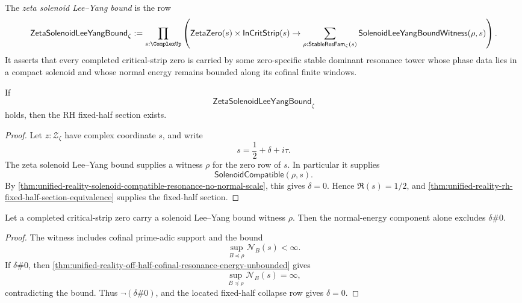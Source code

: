 \begin{definition}
\label{def:unified-reality-zeta-solenoid-lee-yang-bound}
The \emph{zeta solenoid Lee--Yang bound} is the row
$$
\mathsf{ZetaSolenoidLeeYangBound}_{\zeta}
:=
\prod_{s:\ComplexUp}
\left(
\mathsf{ZetaZero}(s)
\times
\mathsf{InCritStrip}(s)
\to
\sum_{\rho:\mathsf{StableResFam}_{\zeta}(s)}
\mathsf{SolenoidLeeYangBoundWitness}(\rho,s)
\right).
$$
It asserts that every completed critical-strip zero is carried by some
zero-specific stable dominant resonance tower whose phase data lies in a
compact solenoid and whose normal energy remains bounded along its
cofinal finite windows.
\end{definition}

\begin{theorem}
\label{thm:unified-reality-zeta-solenoid-lee-yang-bound-conditionally-sufficient}
If
$$
\mathsf{ZetaSolenoidLeeYangBound}_{\zeta}
$$
holds, then the RH fixed-half section exists.
\end{theorem}

\begin{proof}
Let $z:\mathcal Z_{\zeta}$ have complex coordinate $s$, and write
$$
s=\frac12+\delta+i\tau.
$$
The zeta solenoid Lee--Yang bound supplies a witness $\rho$ for the zero
row of $s$.  In particular it supplies
$$
\mathsf{SolenoidCompatible}(\rho,s).
$$
By
\autoref{thm:unified-reality-solenoid-compatible-resonance-no-normal-scale},
this gives $\delta=0$.  Hence $\Re(s)=1/2$, and
\autoref{thm:unified-reality-rh-fixed-half-section-equivalence} supplies
the fixed-half section.
\end{proof}

\begin{theorem}
\label{thm:unified-reality-solenoid-bound-component-same-exclusion}
Let a completed critical-strip zero carry a solenoid Lee--Yang bound
witness $\rho$.  Then the normal-energy component alone excludes
$\delta\#0$.
\end{theorem}

\begin{proof}
The witness includes cofinal prime-adic support and the bound
$$
\sup_{B\preceq\rho}\mathcal N_B(s)<\infty.
$$
If $\delta\#0$, then
\autoref{thm:unified-reality-off-half-cofinal-resonance-energy-unbounded}
gives
$$
\sup_{B\preceq\rho}\mathcal N_B(s)=\infty,
$$
contradicting the bound.  Thus $\neg(\delta\#0)$, and the located
fixed-half collapse row gives $\delta=0$.
\end{proof}

